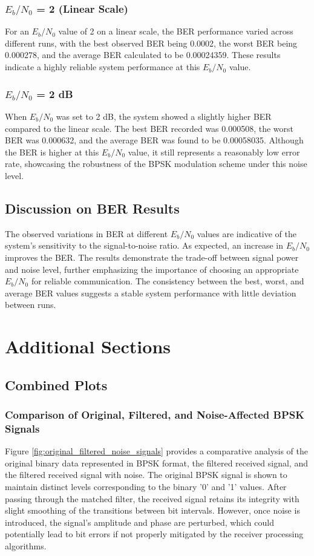 \documentclass[11pt]{article}
\begin{document}
\subsubsection*{\( E_b/N_0 \) = 2 (Linear Scale)}
For an \( E_b/N_0 \) value of 2 on a linear scale, the BER performance varied across different runs, with the best observed BER being 0.0002, the worst BER being 0.000278, and the average BER calculated to be 0.00024359. These results indicate a highly reliable system performance at this \( E_b/N_0 \) value.

\subsubsection*{\( E_b/N_0 \) = 2 dB}
When \( E_b/N_0 \) was set to 2 dB, the system showed a slightly higher BER compared to the linear scale. The best BER recorded was 0.000508, the worst BER was 0.000632, and the average BER was found to be 0.00058035. Although the BER is higher at this \( E_b/N_0 \) value, it still represents a reasonably low error rate, showcasing the robustness of the BPSK modulation scheme under this noise level.

\subsection*{Discussion on BER Results}
The observed variations in BER at different \( E_b/N_0 \) values are indicative of the system's sensitivity to the signal-to-noise ratio. As expected, an increase in \( E_b/N_0 \) improves the BER. The results demonstrate the trade-off between signal power and noise level, further emphasizing the importance of choosing an appropriate \( E_b/N_0 \) for reliable communication. The consistency between the best, worst, and average BER values suggests a stable system performance with little deviation between runs.



\section*{Additional Sections}
\subsection*{Combined Plots}
\subsubsection*{Comparison of Original, Filtered, and Noise-Affected BPSK Signals}
Figure \ref{fig:original_filtered_noise_signals} provides a comparative analysis of the original binary data represented in BPSK format, the filtered received signal, and the filtered received signal with noise. The original BPSK signal is shown to maintain distinct levels corresponding to the binary '0' and '1' values. After passing through the matched filter, the received signal retains its integrity with slight smoothing of the transitions between bit intervals. However, once noise is introduced, the signal's amplitude and phase are perturbed, which could potentially lead to bit errors if not properly mitigated by the receiver processing algorithms.
\end{document}
